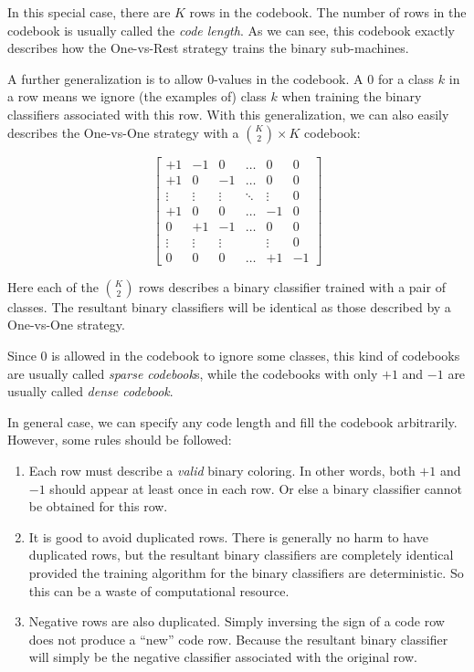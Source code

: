 In this special case, there are $K$ rows in the codebook. The number of rows in
the codebook is usually called the \emph{code length}. As we can see, this
codebook exactly describes how the One-vs-Rest strategy trains the binary
sub-machines.

A further generalization is to allow $0$-values in the codebook. A $0$ for a
class $k$ in a row means we ignore (the examples of) class $k$ when training
the binary classifiers associated with this row. With this generalization, we
can also easily describes the One-vs-One strategy with a $\binom{K}{2}\times K$
codebook:

\[
\begin{bmatrix}
+1     & -1     & 0      & \ldots & 0      & 0 \\
+1     & 0      & -1     & \ldots & 0      & 0 \\
\vdots & \vdots & \vdots & \ddots & \vdots & 0 \\
+1     & 0      & 0      & \ldots & -1     & 0 \\
0      & +1     & -1     & \ldots & 0      & 0 \\
\vdots & \vdots & \vdots &        & \vdots & 0 \\
0      & 0      & 0      & \ldots & +1     & -1
\end{bmatrix}
\]

Here each of the $\binom{K}{2}$ rows describes a binary classifier trained with
a pair of classes. The resultant binary classifiers will be identical as those
described by a One-vs-One strategy.

Since $0$ is allowed in the codebook to ignore some classes, this kind of
codebooks are usually called \emph{sparse codebook}s, while the codebooks with
only $+1$ and $-1$ are usually called \emph{dense codebook}.

In general case, we can specify any code length and fill the codebook
arbitrarily. However, some rules should be followed:

\begin{enumerate}
    \item Each row must describe a \emph{valid} binary coloring. In other
        words, both $+1$ and $-1$ should appear at least once in each row. Or
        else a binary classifier cannot be obtained for this row.
    \item It is good to avoid duplicated rows. There is generally no harm to
        have duplicated rows, but the resultant binary classifiers are
        completely identical provided the training algorithm for the binary
        classifiers are deterministic. So this can be a waste of computational
        resource.
    \item Negative rows are also duplicated. Simply inversing the sign of a code
        row does not produce a ``new'' code row. Because the resultant binary
        classifier will simply be the negative classifier associated with the
        original row.
\end{enumerate}


